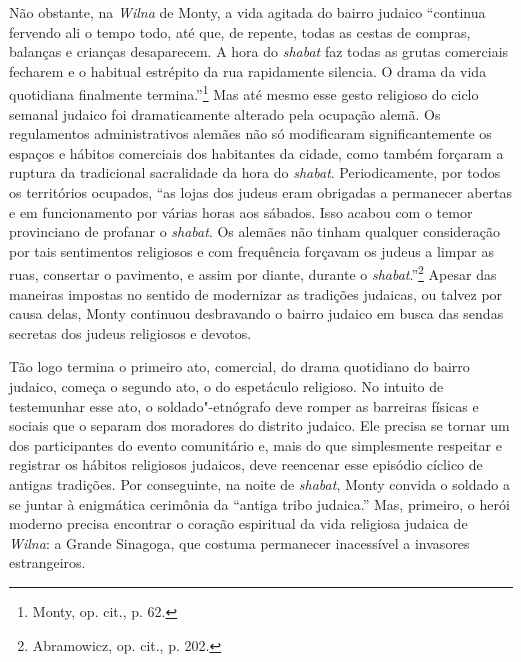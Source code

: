 Não obstante, na \textit{Wilna} de Monty, a vida agitada do bairro judaico
``continua fervendo ali o tempo todo, até que, de repente, todas as
cestas de compras, balanças e crianças desaparecem. A hora do \textit{shabat} faz
todas as grutas comerciais fecharem e o habitual estrépito da rua
rapidamente silencia. O drama da vida quotidiana finalmente
termina.''\footnote{Monty, op. cit., p. 62.} Mas até mesmo esse gesto
religioso do ciclo semanal judaico foi dramaticamente alterado pela
ocupação alemã. Os regulamentos administrativos alemães não só
modificaram significantemente os espaços e hábitos comerciais dos
habitantes da cidade, como também forçaram a ruptura da tradicional
sacralidade da hora do \textit{shabat}. Periodicamente, por todos os territórios
ocupados, ``as lojas dos judeus eram obrigadas a permanecer abertas e em
funcionamento por várias horas aos sábados. Isso acabou com o temor
provinciano de profanar o \textit{shabat}. Os alemães não tinham qualquer
consideração por tais sentimentos religiosos e com frequência forçavam
os judeus a limpar as ruas, consertar o pavimento, e assim por diante,
durante o \textit{shabat}.''\footnote{Abramowicz, op. cit., p. 202.} Apesar das
maneiras impostas no sentido de modernizar as tradições judaicas, ou
talvez por causa delas, Monty continuou desbravando o bairro judaico em
busca das sendas secretas dos judeus religiosos e devotos.

Tão logo termina o primeiro ato, comercial, do drama quotidiano do
bairro judaico, começa o segundo ato, o do espetáculo religioso. No
intuito de testemunhar esse ato, o soldado"-etnógrafo deve romper as
barreiras físicas e sociais que o separam dos moradores do distrito
judaico. Ele precisa se tornar um dos participantes do evento
comunitário e, mais do que simplesmente respeitar e registrar os hábitos
religiosos judaicos, deve reencenar esse episódio cíclico de antigas
tradições. Por conseguinte, na noite de \textit{shabat}, Monty convida o soldado
a se juntar à enigmática cerimônia da ``antiga tribo judaica.'' Mas,
primeiro, o herói moderno precisa encontrar o coração espiritual da vida
religiosa judaica de \textit{Wilna}: a Grande Sinagoga, que costuma permanecer
inacessível a invasores estrangeiros.

%

